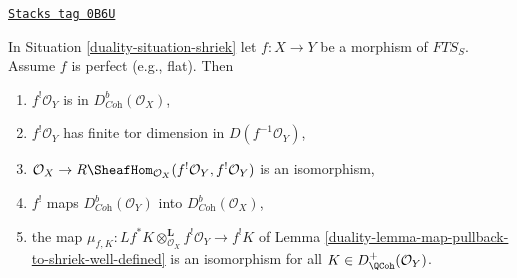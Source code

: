 \begin{lemma}
\label{duality-lemma-perfect-comparison-shriek}
\href{https://stacks.math.columbia.edu/tag/0B6U}{\texttt{Stacks tag 0B6U}}

In Situation \ref{duality-situation-shriek} let $f : X \to Y$ be a morphism of
$\textit{FTS}_S$. Assume $f$ is perfect (e.g., flat). Then
\begin{enumerate}
\item[(a)] $f^!\mathcal{O}_Y$ is in $D_{\textit{Coh}}^b(\mathcal{O}_X)$,
\item[(b)] $f^!\mathcal{O}_Y$ has finite tor dimension in
$D(f^{-1}\mathcal{O}_Y)$,
\item[(c)] $\mathcal{O}_X \to
R\SheafHom_{\mathcal{O}_X}(f^!\mathcal{O}_Y, f^!\mathcal{O}_Y)$
is an isomorphism,
\item[(d)] $f^!$ maps $D_{\textit{Coh}}^b(\mathcal{O}_Y)$ into
$D_{\textit{Coh}}^b(\mathcal{O}_X)$,
\item[(e)] the map
$\mu_{f,  K} :
Lf^*K \otimes_{\mathcal{O}_X}^\mathbf{L} f^!\mathcal{O}_Y
\to
f^!K$
of Lemma \ref{duality-lemma-map-pullback-to-shriek-well-defined}
is an isomorphism for all $K \in D_\QCoh^+(\mathcal{O}_Y)$.
\end{enumerate}
\end{lemma}

